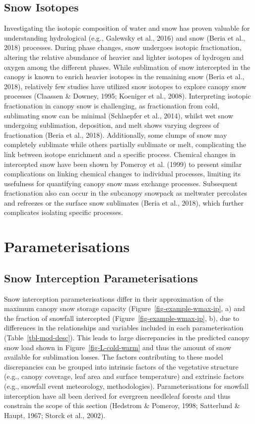 \documentclass[
  letterpaper,
]{tex/uofsthesis-cs}
\begin{document}
\subsection{Snow Isotopes}\label{snow-isotopes}

Investigating the isotopic composition of water and snow has proven
valuable for understanding hydrological (e.g., Galewsky et al., 2016)
and snow (Beria et al., 2018) processes. During phase changes, snow
undergoes isotopic fractionation, altering the relative abundance of
heavier and lighter isotopes of hydrogen and oxygen among the different
phases. While sublimation of snow intercepted in the canopy is known to
enrich heavier isotopes in the remaining snow (Beria et al., 2018),
relatively few studies have utilized snow isotopes to explore canopy
snow processes (Claassen \& Downey, 1995; Koeniger et al., 2008).
Interpreting isotopic fractionation in canopy snow is challenging, as
fractionation from cold, sublimating snow can be minimal (Schlaepfer et
al., 2014), whilst wet snow undergoing sublimation, deposition, and melt
shows varying degrees of fractionation (Beria et al., 2018).
Additionally, some clumps of snow may completely sublimate while others
partially sublimate or melt, complicating the link between isotope
enrichment and a specific process. Chemical changes in intercepted snow
have been shown by Pomeroy et al. (1999) to present similar
complications on linking chemical changes to individual processes,
limiting its usefulness for quantifying canopy snow mass exchange
processes. Subsequent fractionation also can occur in the subcanopy
snowpack as meltwater percolates and refreezes or the surface snow
sublimates (Beria et al., 2018), which further complicates isolating
specific processes.

\section{Parameterisations}\label{sec-parameterisations}

\subsection{Snow Interception Parameterisations}\label{sec-interception}

Snow interception parameterisations differ in their approximation of the
maximum canopy snow storage capacity (Figure~\ref{fig-example-wmax-ip},
a) and the fraction of snowfall intercepted
(Figure~\ref{fig-example-wmax-ip}, b), due to differences in the
relationships and variables included in each parameterisation
(Table~\ref{tbl-mod-desc}). This leads to large discrepancies in the
predicted canopy snow load shown in Figure~\ref{fig-L-cold-warm} and
thus the amount of snow available for sublimation losses. The factors
contributing to these model discrepancies can be grouped into intrinsic
factors of the vegetative structure (e.g., canopy coverage, leaf area
and surface temperature) and extrinsic factors (e.g., snowfall event
meteorology, methodologies). Parameterisations for snowfall interception
have all been derived for evergreen needleleaf forests and thus
constrain the scope of this section (Hedstrom \& Pomeroy, 1998;
Satterlund \& Haupt, 1967; Storck et al., 2002).
\end{document}

